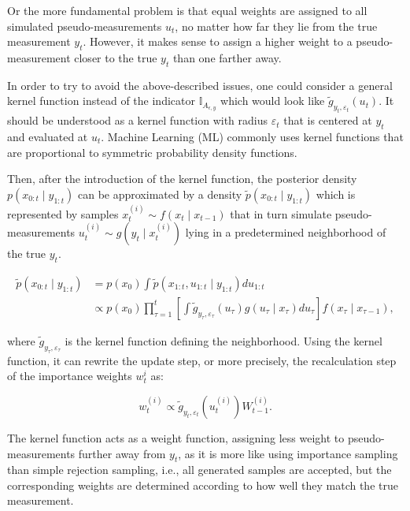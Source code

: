 Or the more fundamental problem is that equal weights are assigned to all simulated pseudo-measurements \(u_t\), no matter how far they lie from the true measurement \(y_t\). However, it makes sense to assign a higher weight to a pseudo-measurement closer to the true \(y_t\) than one farther away.

In order to try to avoid the above-described issues, one could consider a general kernel function instead of the indicator \(\mathbb{I}_{A_{\epsilon, y}}\) which would look like \(\tilde{g}_{y_t, \varepsilon_t}\left(u_t\right)\). It should be understood as a kernel function with radius \(\varepsilon_t\) that is centered at \(y_t\) and evaluated at \(u_t\). Machine Learning (ML) commonly uses kernel functions that are proportional to symmetric probability density functions.

Then, after the introduction of the kernel function, the posterior density \(p\left(x_{0:t} \mid y_{1:t}\right)\) can be approximated by a density \(\tilde{p}\left(x_{0:t} \mid y_{1:t}\right)\)  which is represented by samples \(x_t^{(i)} \sim f\left(x_t \mid x_{t-1}\right)\)  that in turn simulate pseudo-measurements \(u_t^{(i)} \sim  g\left(y_t \mid x_t^{(i)} \right)\) lying in a predetermined neighborhood of the true \(y_t\).

\begin{equation}
    \begin{aligned}
\tilde{p}\left(x_{0: t} \mid y_{1: t}\right) &=p\left(x_0\right) \int \tilde{p}\left(x_{1: t}, u_{1: t} \mid y_{1: t}\right) d u_{1: t} \\
& \propto p\left(x_0\right) \prod_{\tau=1}^t\left[\int \tilde{g}_{y_\tau, \varepsilon_\tau}\left(u_\tau\right) g\left(u_\tau \mid x_\tau\right) d u_\tau\right] f\left(x_\tau \mid x_{\tau-1}\right),
\end{aligned}
\end{equation}

\noindent where \(\tilde{g}_{y_\tau, \varepsilon_\tau}\) is the kernel function defining the neighborhood. Using the kernel function, it can rewrite the update step, or more precisely, the recalculation step of the importance weights \(w_t^{i}\) as:

\begin{equation}
    w_t^{(i)} \propto \tilde{g}_{y_t, \varepsilon_t}\left(u_t^{(i)}\right) W_{t-1}^{(i)}.
\end{equation}

The kernel function acts as a weight function, assigning less weight to pseudo-measurements further away from \(y_t\), as it is more like using importance sampling than simple rejection sampling, i.e., all generated samples are accepted, but the corresponding weights are determined according to how well they match the true measurement.

